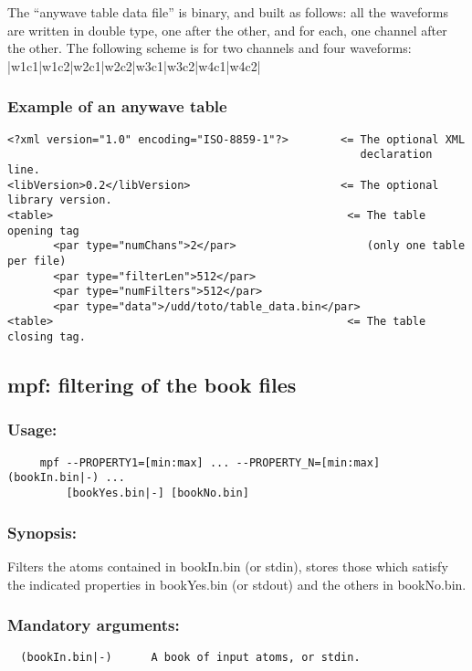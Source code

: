 \documentclass[11pt,a4paper]{article}
\begin{document}
The ``anywave table data file'' is binary, and built as follows: all the
waveforms are written in double type, one after the other, and for each, one
channel after the other. The following scheme is for two channels and four
waveforms: {\center |w1c1|w1c2|w2c1|w2c2|w3c1|w3c2|w4c1|w4c2| }

\subsubsection*{Example of an anywave table}
\begin{verbatim}
<?xml version="1.0" encoding="ISO-8859-1"?>        <= The optional XML
                                                      declaration line.
<libVersion>0.2</libVersion>                       <= The optional library version.
<table>                                             <= The table opening tag
       <par type="numChans">2</par>                    (only one table per file)
       <par type="filterLen">512</par>
       <par type="numFilters">512</par>
       <par type="data">/udd/toto/table_data.bin</par>
<table>                                             <= The table closing tag.
\end{verbatim}



\clearpage
\subsection{mpf: filtering of the book files}

\subsubsection*{Usage:}
\begin{verbatim}
     mpf --PROPERTY1=[min:max] ... --PROPERTY_N=[min:max] (bookIn.bin|-) ...
         [bookYes.bin|-] [bookNo.bin]
\end{verbatim}

\subsubsection*{Synopsis:}
Filters the atoms contained in bookIn.bin (or stdin), stores those which
satisfy the indicated properties in bookYes.bin (or stdout) and the others in
bookNo.bin.

\subsubsection*{Mandatory arguments:}
\begin{verbatim}
  (bookIn.bin|-)      A book of input atoms, or stdin.
\end{verbatim}
\end{document}
